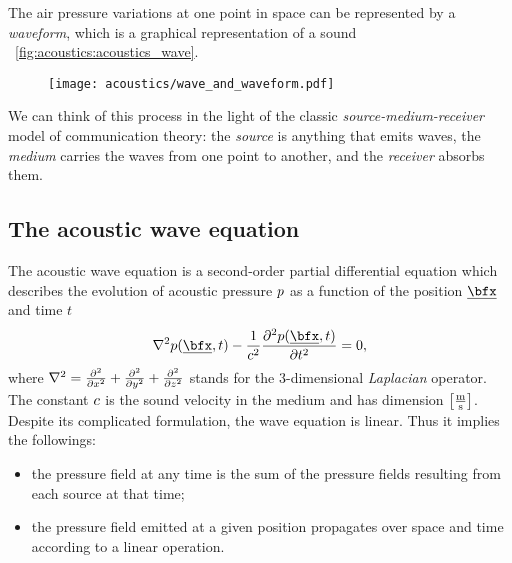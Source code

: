 The air pressure variations at one point in space can be represented by a \textit{waveform}, which is a graphical representation of a sound
~\cref{fig:acoustics:acoustics_wave}.

\begin{figure}[h]
    \texttt{[image: acoustics/wave\_and\_waveform.pdf]}
\end{figure}

We can think of this process in the light of the classic \textit{source-medium-receiver} model of communication theory:
the \textit{source} is anything that emits waves, the \textit{medium} carries the waves from one point to another, and the \textit{receiver} absorbs them.

\subsection{The acoustic wave equation}\label{subsec:acoustics:waveq}
The acoustic wave equation is a second-order partial differential equation which describes the evolution of acoustic pressure $\pressure$
as a function of the position $\positionMicrophone$ and time $t$
\begin{equation}
    \label{eq:acoustics:wave}
    \knabla^2 \pressureSpaceTime - \frac{1}{\speedOfSound^2} \kpderiv[2]{\pressureSpaceTime}{t} = 0
    ,
\end{equation}
where $\knabla^2 = \kpderiv[2]{}{x} + \kpderiv[2]{}{y} + \kpderiv[2]{}{z}$ stands for the 3-dimensional \textit{Laplacian} operator.
The constant $\speedOfSound$ is the sound velocity in the medium and has dimension $\kbracket{\frac{\si{\metre}}{\si{\second}}}$.
\\Despite its complicated formulation, the wave equation is linear. Thus it implies the followings:
\begin{itemize}
    \item the pressure field at any time is the sum of the pressure fields resulting from each source at that time;
    \item the pressure field emitted at a given position propagates over space and time according to a linear operation.
\end{itemize}

